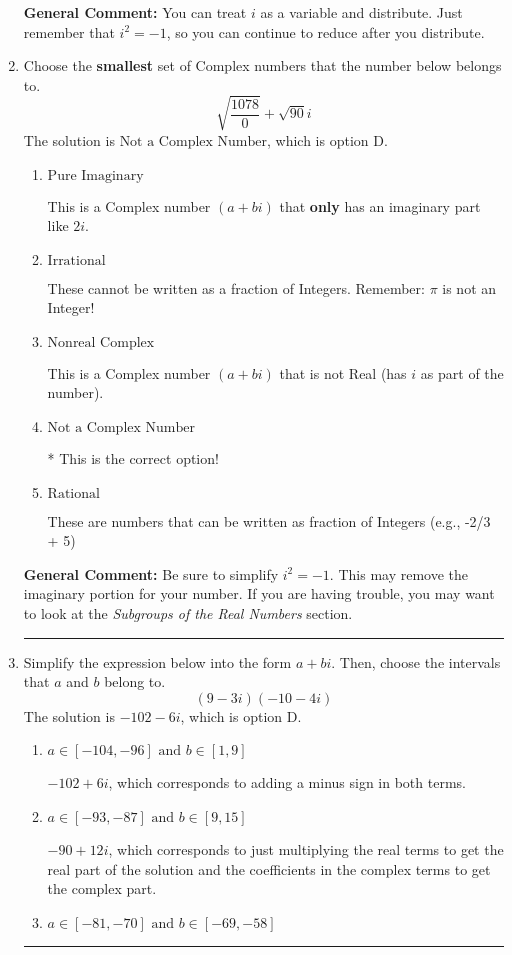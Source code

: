 \documentclass{extbook}[14pt]
\newcommand{\litem}[1]{\item #1

\rule{\textwidth}{0.4pt}}
\begin{document}
\begin{enumerate}
{\textbf{General Comment:} You can treat $i$ as a variable and distribute. Just remember that $i^2=-1$, so you can continue to reduce after you distribute.
}
\litem{
Choose the \textbf{smallest} set of Complex numbers that the number below belongs to.
\[ \sqrt{\frac{1078}{0}}+\sqrt{90} i \]The solution is \( \text{Not a Complex Number} \), which is option D.\begin{enumerate}[label=\Alph*.]
\item \( \text{Pure Imaginary} \)

This is a Complex number $(a+bi)$ that \textbf{only} has an imaginary part like $2i$.
\item \( \text{Irrational} \)

These cannot be written as a fraction of Integers. Remember: $\pi$ is not an Integer!
\item \( \text{Nonreal Complex} \)

This is a Complex number $(a+bi)$ that is not Real (has $i$ as part of the number).
\item \( \text{Not a Complex Number} \)

* This is the correct option!
\item \( \text{Rational} \)

These are numbers that can be written as fraction of Integers (e.g., -2/3 + 5)
\end{enumerate}

\textbf{General Comment:} Be sure to simplify $i^2 = -1$. This may remove the imaginary portion for your number. If you are having trouble, you may want to look at the \textit{Subgroups of the Real Numbers} section.
}
\litem{
Simplify the expression below into the form $a+bi$. Then, choose the intervals that $a$ and $b$ belong to.
\[ (9 - 3 i)(-10 - 4 i) \]The solution is \( -102 - 6 i \), which is option D.\begin{enumerate}[label=\Alph*.]
\item \( a \in [-104, -96] \text{ and } b \in [1, 9] \)

 $-102 + 6 i$, which corresponds to adding a minus sign in both terms.
\item \( a \in [-93, -87] \text{ and } b \in [9, 15] \)

 $-90 + 12 i$, which corresponds to just multiplying the real terms to get the real part of the solution and the coefficients in the complex terms to get the complex part.
\item \( a \in [-81, -70] \text{ and } b \in [-69, -58] \)


\end{enumerate}}
\end{enumerate}
\end{document}
